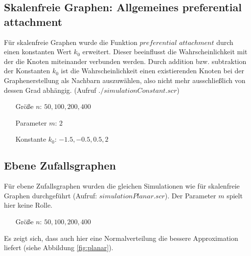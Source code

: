 \documentclass[10pt]{article}
\begin{document}
\subsection{Skalenfreie Graphen: Allgemeines preferential attachment}
Für skalenfreie Graphen wurde die Funktion $preferential$ $attachment$ durch einen konstanten Wert $k_0$ erweitert. Dieser beeinflusst die Wahrscheinlichkeit mit der die Knoten miteinander verbunden werden. Durch addition bzw. subtraktion der Konstanten $k_0$ ist die Wahrscheinlichkeit einen existierenden Knoten bei der Graphenerstellung als Nachbarn auszuwählen, also nicht mehr ausschließlich von dessen Grad abhängig. (Aufruf $./simulationConstant.scr$) 

\begin{itemize}
\item[\quad Größe $n$:] $50,100,200,400$
\item[\quad Parameter $m$:] $2$
\item[\quad Konstante $k_0$:] $-1.5,-0.5,0.5,2$
\end{itemize}


\subsection{Ebene Zufallsgraphen}
Für ebene Zufallsgraphen wurden die gleichen Simulationen wie für skalenfreie Graphen durchgeführt (Aufruf: $simulationPlanar.scr$). Der Parameter $m$ spielt hier keine Rolle.
\begin{itemize}
\item[\quad Größe $n$:] $50,100,200,400$
\end{itemize}
Es zeigt sich, dass auch hier eine Normalverteilung die bessere Approximation liefert (siehe Abbildung \ref{fig:planar}).
\end{document}
